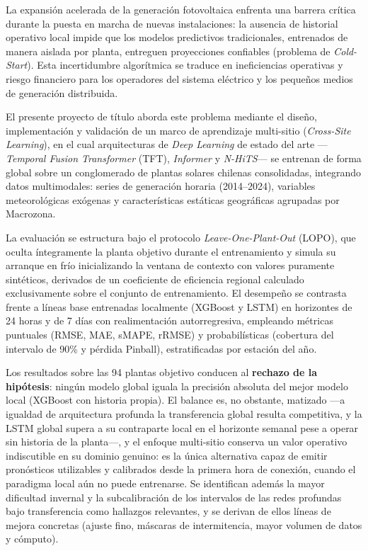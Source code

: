 La expansión acelerada de la generación fotovoltaica enfrenta una barrera crítica durante la puesta en marcha de nuevas instalaciones: la ausencia de historial operativo local impide que los modelos predictivos tradicionales, entrenados de manera aislada por planta, entreguen proyecciones confiables (problema de \textit{Cold-Start}). Esta incertidumbre algorítmica se traduce en ineficiencias operativas y riesgo financiero para los operadores del sistema eléctrico y los pequeños medios de generación distribuida.

El presente proyecto de título aborda este problema mediante el diseño, implementación y validación de un marco de aprendizaje multi-sitio (\textit{Cross-Site Learning}), en el cual arquitecturas de \textit{Deep Learning} de estado del arte —\textit{Temporal Fusion Transformer} (TFT), \textit{Informer} y \textit{N-HiTS}— se entrenan de forma global sobre un conglomerado de plantas solares chilenas consolidadas, integrando datos multimodales: series de generación horaria (2014--2024), variables meteorológicas exógenas y características estáticas geográficas agrupadas por Macrozona.

La evaluación se estructura bajo el protocolo \textit{Leave-One-Plant-Out} (LOPO), que oculta íntegramente la planta objetivo durante el entrenamiento y simula su arranque en frío inicializando la ventana de contexto con valores puramente sintéticos, derivados de un coeficiente de eficiencia regional calculado exclusivamente sobre el conjunto de entrenamiento. El desempeño se contrasta frente a líneas base entrenadas localmente (XGBoost y LSTM) en horizontes de 24 horas y de 7 días con realimentación autorregresiva, empleando métricas puntuales (RMSE, MAE, sMAPE, rRMSE) y probabilísticas (cobertura del intervalo de 90\% y pérdida Pinball), estratificadas por estación del año.

Los resultados sobre las 94 plantas objetivo conducen al \textbf{rechazo de la hipótesis}: ningún modelo global iguala la precisión absoluta del mejor modelo local (XGBoost con historia propia). El balance es, no obstante, matizado —a igualdad de arquitectura profunda la transferencia global resulta competitiva, y la LSTM global supera a su contraparte local en el horizonte semanal pese a operar sin historia de la planta—, y el enfoque multi-sitio conserva un valor operativo indiscutible en su dominio genuino: es la única alternativa capaz de emitir pronósticos utilizables y calibrados desde la primera hora de conexión, cuando el paradigma local aún no puede entrenarse. Se identifican además la mayor dificultad invernal y la subcalibración de los intervalos de las redes profundas bajo transferencia como hallazgos relevantes, y se derivan de ellos líneas de mejora concretas (ajuste fino, máscaras de intermitencia, mayor volumen de datos y cómputo).
